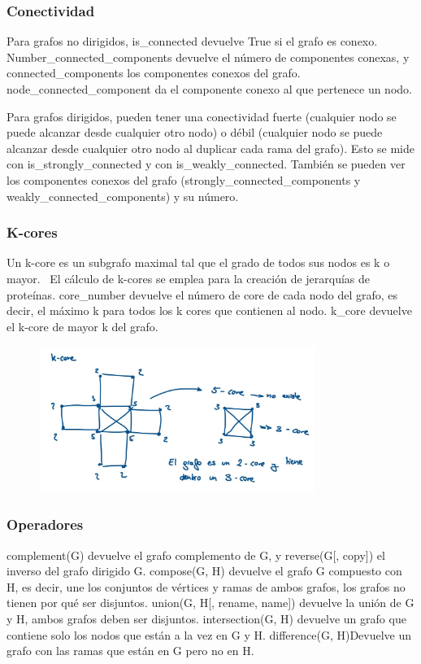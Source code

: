\subsubsection{Conectividad}
Para grafos no dirigidos, is\_connected devuelve True si el grafo es conexo. Number\_connected\_components devuelve el número de componentes conexas, y connected\_components los componentes conexos del grafo. node\_connected\_component da el componente conexo al que pertenece un nodo.

Para grafos dirigidos, pueden tener una conectividad fuerte (cualquier nodo se puede alcanzar desde cualquier otro nodo) o débil (cualquier nodo se puede alcanzar desde cualquier otro nodo al duplicar cada rama del grafo). Esto se mide con is\_strongly\_connected y con is\_weakly\_connected. También se pueden ver los componentes conexos del grafo (strongly\_connected\_components y weakly\_connected\_components) y su número.

\subsubsection{K-cores}
Un k-core es un subgrafo maximal tal que el grado de todos sus nodos es k o mayor. 
 \
El cálculo de k-cores se emplea para la creación de jerarquías de proteínas. core\_number devuelve el número de core de cada nodo del grafo, es decir, el máximo k para todos los k cores que contienen al nodo. k\_core devuelve el k-core de mayor k del grafo.

\begin{figure}[h]
\centering
\includegraphics[width = 0.8\textwidth]{figs/kcore.jpg}
\end{figure}

\subsubsection{Operadores}
complement(G) devuelve el grafo complemento de G, y reverse(G[, copy]) el inverso del grafo dirigido G. compose(G, H) devuelve el grafo G compuesto con H, es decir, une los conjuntos de vértices y ramas de ambos grafos, los grafos no tienen por qué ser disjuntos. union(G, H[, rename, name]) devuelve la unión de G y H, ambos grafos deben ser disjuntos. intersection(G, H) devuelve un grafo que contiene solo
los nodos que están a la vez en G y H. difference(G, H)Devuelve un grafo con las ramas que están en G pero no en H.

